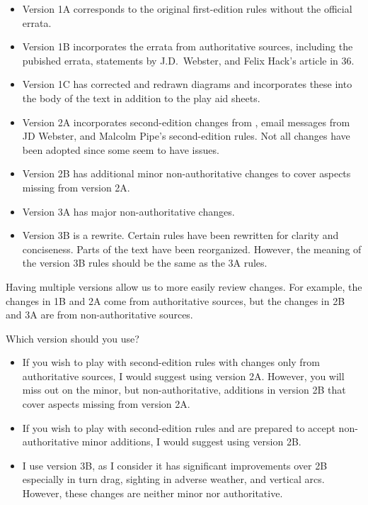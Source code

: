 \documentclass[10pt]{report}
\begin{document}
\begin{itemize}
    \item Version 1A corresponds to the original first-edition rules without the official errata.
    \item Version 1B incorporates the errata from authoritative sources, including the pubished errata, statements by J.D.\ Webster, and Felix Hack’s article in {\APJ} 36.
    \item Version 1C has corrected and redrawn diagrams and incorporates these into the body of the text in addition to the play aid sheets.
    \item Version 2A incorporates second-edition changes from {\APJ}, email messages from JD Webster, and Malcolm Pipe’s second-edition rules. Not all changes have been adopted since some seem to have issues.
    \item Version 2B has additional minor non-authoritative changes to cover aspects missing from version 2A.
    \item Version 3A has major non-authoritative changes.
    \item Version 3B is a rewrite. Certain rules have been rewritten for clarity and conciseness. Parts of the text have been reorganized. However, the meaning of the version 3B rules should be the same as the 3A rules.
\end{itemize}

Having multiple versions allow us to more easily review changes. For example, the changes in 1B and 2A come from authoritative sources, but the changes in 2B and 3A are from non-authoritative sources.

Which version should you use?

\begin{itemize}
    \item If you wish to play with second-edition rules with changes only from authoritative sources, I would suggest using version 2A. However, you will miss out on the minor, but non-authoritative, additions in version 2B that cover aspects missing from version 2A.
    \item If you wish to play with second-edition rules and are prepared to accept non-authoritative minor additions, I would suggest using version 2B.
    \item I use version 3B, as I consider it has significant improvements over 2B especially in turn drag, sighting in adverse weather, and vertical arcs. However, these changes are neither minor nor authoritative.
\end{itemize}    
\end{document}
